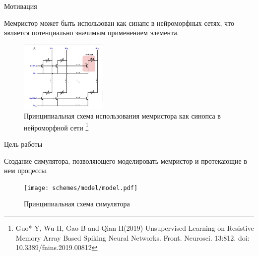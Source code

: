 \documentclass{beamer}%
\begin{document}
\begin{frame}{Мотивация}
\begin{multicols}{2}
Мемристор может быть использован как синапс в нейроморфных сетях, что является потенциально значимым применением элемента.

\columnbreak
    
    \begin{figure}
        \centering
        \includegraphics[width=160px]{img/sinaps-memristor-scheme.jpg}
        \caption{Принципиальная схема использования мемристора как синопса в нейроморфной сети%
        \footnote{%
        Guo* Y, Wu H, Gao B and Qian H(2019) Unsupervised Learning on Resistive Memory Array Based Spiking Neural Networks. Front. Neurosci. 13:812. doi: 10.3389/fnins.2019.00812
        }%
    }
    \end{figure}
\end{multicols}

\end{frame}


\begin{frame}{Цель работы}

Создание симулятора, позволяющего моделировать мемристор
и протекающие в нем процессы.
\begin{figure}
    \centering
    \texttt{[image: schemes/model/model.pdf]}
    \caption{
        Принципиальная схема симулятора
}
\end{figure}






\end{frame}
\end{document}
